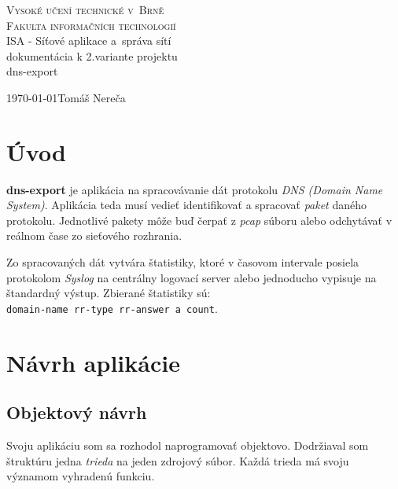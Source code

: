 \documentclass{article}
\begin{document}
    \begin{titlepage}
        \begin{center}
            \textsc{\Huge Vysoké učení technické v~Brně\\
            		\huge Fakulta informačních technologií\\}
            {\LARGE ISA - Síťové aplikace a~správa sítí\\}\vspace{2em}
            {\Large dokumentácia k 2.variante projektu\\}\vspace{2em}
            \Huge dns-export\\
        \end{center}
        {\Large \today \hfill Tomáš Nereča}\vspace{-2em}
    \end{titlepage}

    \tableofcontents
        \thispagestyle{empty}
        \newpage
        \setcounter{page}{1}
    \newpage
    
    \section{Úvod}

        \textbf{dns-export} je aplikácia na spracovávanie dát protokolu \emph{DNS (Domain Name System)}.
        Aplikácia teda musí vedieť identifikovať a spracovať \emph{paket} daného protokolu.
        Jednotlivé pakety môže buď čerpať z \emph{pcap} súboru alebo odchytávať v reálnom čase
        zo sieťového rozhrania.

        Zo spracovaných dát vytvára štatistiky, ktoré v časovom intervale posiela protokolom \emph{Syslog}
        na centrálny logovací server alebo jednoducho vypisuje na štandardný výstup. Zbierané štatistiky sú:\\
        \texttt{domain-name rr-type rr-answer a count}.
    
    \section{Návrh aplikácie}

        \subsection{Objektový návrh}
        Svoju aplikáciu som sa rozhodol naprogramovať objektovo. Dodržiaval som štruktúru jedna \emph{trieda}
        na jeden zdrojový súbor. Každá trieda má svoju významom vyhradenú funkciu. 
\end{document}
